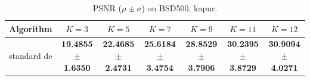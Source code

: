 \begin{table}[htbp]
\centering
\caption{PSNR ($\mu \pm \sigma$) on BSD500, kapur.}
\label{tab:exp1-kapur-psnr}
\begin{tabular}{lcccccc}
\toprule
Algorithm & $K=3$ & $K=5$ & $K=7$ & $K=9$ & $K=11$ & $K=12$ \\
\midrule
standard de & \textbf{19.4855 $\pm$ 1.6350} & \textbf{22.4685 $\pm$ 2.4731} & \textbf{25.6184 $\pm$ 3.4754} & \textbf{28.8529 $\pm$ 3.7906} & \textbf{30.2395 $\pm$ 3.8729} & \textbf{30.9094 $\pm$ 4.0271} \\
\bottomrule
\end{tabular}
\end{table}